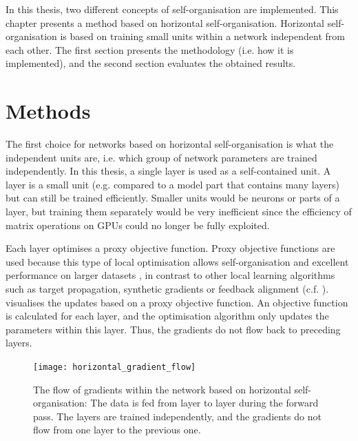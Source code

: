 In this thesis, two different concepts of self-organisation are implemented.
This chapter presents a method based on horizontal self-organisation.
Horizontal self-organisation is based on training small units within a network independent from each other.
The first section presents the methodology (i.e. how it is implemented), and the second section evaluates the obtained results.


\section{Methods}
The first choice for networks based on horizontal self-organisation is what the independent units are, i.e. which group of network parameters are trained independently.
In this thesis, a single layer is used as a self-contained unit. A layer is a small unit (e.g. compared to a model part that contains many layers) but can still be trained efficiently.
Smaller units would be neurons or parts of a layer, but training them separately would be very inefficient since the efficiency of matrix operations on GPUs could no longer be fully exploited.

Each layer optimises a proxy objective function.
Proxy objective functions are used because this type of local optimisation allows self-organisation and excellent performance on larger datasets , in contrast to other local learning algorithms such as target propagation, synthetic gradients or feedback alignment (c.f. ). 
  visualises the updates based on a proxy objective function.
An objective function is calculated for each layer, and the optimisation algorithm only updates the parameters within this layer.
Thus, the gradients do not flow back to preceding layers.

\begin{figure}[h]
    \centering
    \texttt{[image: horizontal\_gradient\_flow]}
    \caption[The flow of gradients within the network based on horizontal self-organisation]{The flow of gradients within the network based on horizontal self-organisation: The data is fed from layer to layer during the forward pass. The layers are trained independently, and the gradients do not flow from one layer to the previous one.}
\end{figure}


